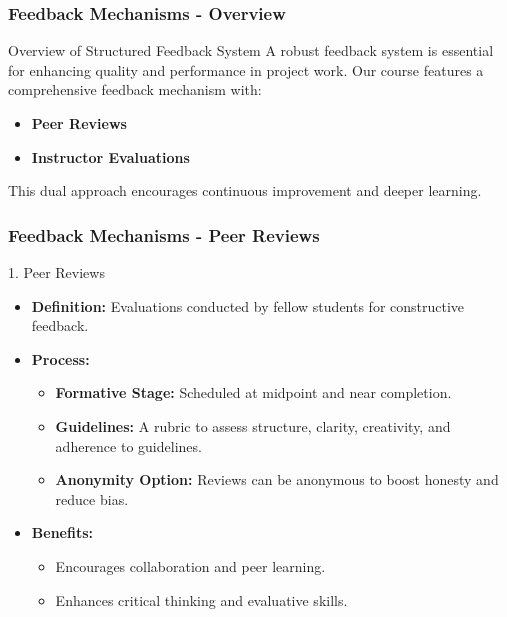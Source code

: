 \documentclass[aspectratio=169]{beamer}
\begin{document}
\begin{frame}[fragile]
  \frametitle{Feedback Mechanisms - Overview}
  \begin{block}{Overview of Structured Feedback System}
    A robust feedback system is essential for enhancing quality and performance in project work. 
    Our course features a comprehensive feedback mechanism with:
    \begin{itemize}
      \item \textbf{Peer Reviews}
      \item \textbf{Instructor Evaluations}
    \end{itemize}
    This dual approach encourages continuous improvement and deeper learning.
  \end{block}
\end{frame}

\begin{frame}[fragile]
  \frametitle{Feedback Mechanisms - Peer Reviews}
  \begin{block}{1. Peer Reviews}
    \begin{itemize}
      \item \textbf{Definition:} Evaluations conducted by fellow students for constructive feedback.
    
      \item \textbf{Process:}
      \begin{itemize}
        \item \textbf{Formative Stage:} Scheduled at midpoint and near completion.
        \item \textbf{Guidelines:} A rubric to assess structure, clarity, creativity, and adherence to guidelines.
        \item \textbf{Anonymity Option:} Reviews can be anonymous to boost honesty and reduce bias.
      \end{itemize}
      
      \item \textbf{Benefits:}
      \begin{itemize}
        \item Encourages collaboration and peer learning.
        \item Enhances critical thinking and evaluative skills.
      \end{itemize}
    \end{itemize}
  \end{block}
\end{frame}
\end{document}
